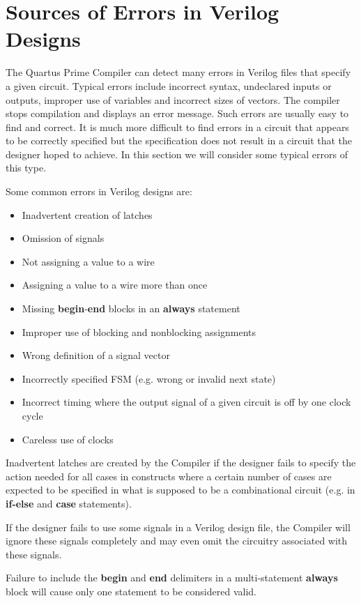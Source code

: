 \documentclass[11pt, twoside, pdftex]{article}
\begin{document}
\section{Sources of Errors in Verilog Designs}
The Quartus Prime Compiler can detect many errors in Verilog files that specify
a given circuit. Typical errors include incorrect syntax, undeclared inputs or 
outputs, improper use of variables and incorrect sizes of vectors.
The compiler stops compilation and displays an error message.
Such errors are usually easy to find and correct. It is much more difficult
to find errors in a circuit that appears to be correctly specified but the
specification does not result in a circuit that the designer hoped to achieve.  
In this section we will consider some typical errors of this type.

Some common errors in Verilog designs are:
\begin{itemize}
\item Inadvertent creation of latches
\item Omission of signals
\item Not assigning a value to a wire
\item Assigning a value to a wire more than once
\item Missing {\bf begin}-{\bf end} blocks in an {\bf always} statement
\item Improper use of blocking and nonblocking assignments
\item Wrong definition of a signal vector
\item Incorrectly specified FSM (e.g. wrong or invalid next state)
\item Incorrect timing where the output signal of a given circuit is off
by one clock cycle
\item Careless use of clocks
\end{itemize}

Inadvertent latches are created by the Compiler if the designer fails to
specify the action needed for all cases in constructs where a certain number
of cases are expected to be specified in what is supposed to be a
combinational circuit (e.g. in {\bf if-else} and {\bf case} statements). 

If the designer fails to use some signals in a Verilog design file, the
Compiler will ignore these signals completely and may even omit the
circuitry associated with these signals.

Failure to include the {\bf begin} and {\bf end} delimiters in a multi-statement
{\bf always} block will cause only one statement to be considered valid.
\end{document}
